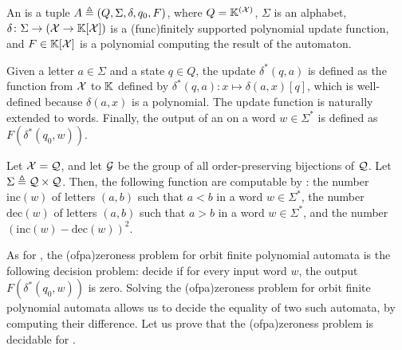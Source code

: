 
\begin{definition}
  \label{def:orbit-finite-polynomial-automaton}
  An  is a tuple $A \triangleq (Q, \Sigma, \delta, q_0, F)$, where $Q =
  \mathbb{K}^{(\mathcal{X})}$, $\Sigma$ is an  alphabet, $\delta \colon
  \Sigma \to (\mathcal{X} \to \mathbb{K}[\mathcal{X}])$ is a \kl(func){finitely supported}
  polynomial update function, and $F \in \mathbb{K}[\mathcal{X}]$ is a polynomial
  computing the result of the automaton. 

  Given a letter $a \in \Sigma$ and a
  state $q \in Q$, the update $\delta^*(q,a)$ is defined as the function from
  $\mathcal{X}$ to $\mathbb{K}$ defined by $\delta^*(q,a) \colon x \mapsto \delta(a,x)[ q ]$,
  which is well-defined because $\delta(a,x)$ is a 
  polynomial. The update function is naturally extended to words. Finally, the
  output of an  on a word $w \in \Sigma^*$
  is defined as $F(\delta^*(q_0, w))$.
\end{definition}


\begin{example}
  \label{ex:orbit-finite-polynomial-automata}
  Let $\mathcal{X} = \mathcal{Q}$, and let $\mathcal{G}$ be the group of all
  order-preserving bijections of $\mathcal{Q}$.
  Let $\Sigma \triangleq \mathcal{Q} \times \mathcal{Q}$.
  Then, the following function are computable by 
  :
  the number $\mathrm{inc}(w)$ of letters $(a,b)$ such that $a < b$ in a word $w \in \Sigma^*$,
  the number $\mathrm{dec}(w)$ of letters $(a,b)$ such that $a > b$ in a word $w \in \Sigma^*$,
  and the number $(\mathrm{inc}(w) - \mathrm{dec}(w))^2$.
\end{example}

\AP As for , the \intro(ofpa){zeroness problem} for
orbit finite polynomial automata is the following decision problem: decide if
for every input word $w$, the output $F(\delta^*(q_0, w))$ is zero. Solving the
\kl(ofpa){zeroness problem} for orbit finite polynomial automata allows us to
decide the equality of two such automata, by computing their difference. Let us
prove that the \kl(ofpa){zeroness problem} is decidable for .


